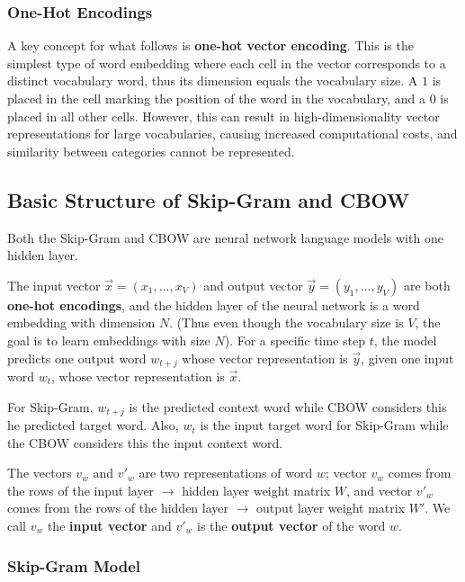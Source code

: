 \subsubsection{One-Hot Encodings}

A key concept for what follows is \textbf{one-hot vector encoding}. This is the simplest type of word embedding where each cell in the vector corresponds to a distinct vocabulary word, thus its dimension equals the vocabulary size. A $1$ is placed in the cell marking the position of the word in the vocabulary, and a $0$ is placed in all other cells. However, this can result in high-dimensionality vector representations for large vocabularies, causing increased computational costs, and similarity between categories cannot be represented. 

\subsection{Basic Structure of Skip-Gram and CBOW}

Both the Skip-Gram and CBOW are neural network language models with one hidden layer. 

The input vector $\overrightarrow{x} = (x_1,..., x_V)$ and output vector $\overrightarrow{y} = (y_1,...,y_V)$ are both \textbf{one-hot encodings}, and the hidden layer of the neural network is a word embedding with dimension $N$. (Thus even though the vocabulary size is $V$, the goal is to learn embeddings with size $N$). For a specific time step $t$, the model predicts one output word $w_{t+j}$ whose vector representation is $\overrightarrow{y}$, given one input word $w_t$, whose vector representation is $\overrightarrow{x}$. 

For Skip-Gram, $w_{t+j}$ is the predicted context word while CBOW considers this he predicted target word. Also, $w_t$ is the input target word for Skip-Gram while the CBOW considers this the input context word. 

The vectors $v_w$ and $v'_w$ are two representations of word $w$; vector $v_w$ comes from the rows of the input layer $\rightarrow$ hidden layer weight matrix $W$, and vector $v'_w$ comes from the rows of the hidden layer $\rightarrow$ output layer weight matrix $W'$. We call $v_w$ the \textbf{input vector} and $v'_w$ is the \textbf{output vector} of the word $w$. 


\subsubsection{Skip-Gram Model}

